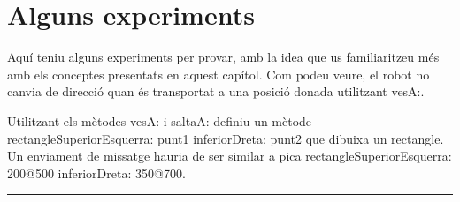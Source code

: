
\section{Alguns experiments}

Aquí teniu alguns experiments per provar, amb la idea que us familiaritzeu més amb els conceptes presentats en aquest capítol. Com podeu veure, el robot no canvia de direcció quan és transportat a una posició donada utilitzant \textsf{vesA:}. 

\begin{center}
\colorbox{black}{}
\end{center}
{\small
\noindent
Utilitzant els mètodes \textsf{vesA:} i \textsf{saltaA:} definiu un mètode \textsf{rectangleSuperiorEsquerra: punt1 inferiorDreta: punt2} que dibuixa un rectangle. Un enviament de missatge hauria de ser similar a \textsf{pica rectangleSuperiorEsquerra: 200@500 inferiorDreta: 350@700}.}\\
\noindent
\rule{\textwidth}{3pt}

